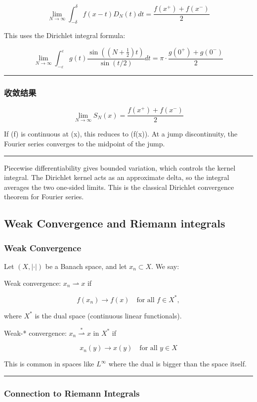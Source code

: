 \[
\lim_{N \to \infty} \int_{-δ}^{δ} f(x-t) D_N(t) dt = \frac{f(x^+) + f(x^-)}{2}
\]

This uses the Dirichlet integral formula:

\[
\lim_{N \to \infty} \int_{-ε}^{ε} g(t) \frac{\sin((N+\frac12)t)}{\sin(t/2)} dt = \pi \cdot \frac{g(0^+) + g(0^-)}{2}
\]

\hrule

\subsubsection{收敛结果}

\[
\boxed{
\lim_{N \to \infty} S_N(x) = \frac{f(x^+) + f(x^-)}{2}
}
\]

If (f) is continuous at (x), this reduces to (f(x)). At a jump discontinuity, the Fourier series converges to the midpoint of the jump.

\hrule

Piecewise differentiability gives bounded variation, which controls the kernel integral. The Dirichlet kernel acts as an approximate delta, so the integral averages the two one-sided limits. This is the classical Dirichlet convergence theorem for Fourier series.

\subsection{Weak Convergence and Riemann integrals}

\subsubsection{Weak Convergence}

Let \((X, |\cdot|)\) be a Banach space, and let \({x_n} \subset X\). We say:

Weak convergence: \(x_n \rightharpoonup x\) if

\[
f(x_n) \to f(x) \quad \text{for all } f \in X^*,
\]

where \(X^*\) is the dual space (continuous linear functionals).

Weak-* convergence: \(x_n \stackrel{*}{\rightharpoonup} x\) in \(X^*\) if

\[
x_n(y) \to x(y) \quad \text{for all } y \in X
\]

This is common in spaces like \(L^\infty\) where the dual is bigger than the space itself.

\hrule

\subsubsection{Connection to Riemann Integrals}

